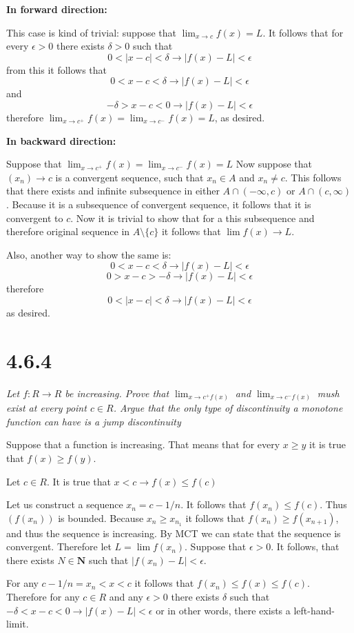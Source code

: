 \documentclass[11pt,oneside,titlepage]{book}
\begin{document}
\textbf{In forward direction:}

This case is kind of trivial: suppose that $\lim_{x \to c} f(x) = L$.
It follows that for every $\epsilon > 0$ there exists $\delta > 0$ such that
$$0 < |x - c| < \delta \to |f(x) - L| < \epsilon$$
from this it follows that
$$0 < x - c < \delta \to |f(x) - L| < \epsilon$$
and
$$-\delta > x - c < 0 \to |f(x) - L| < \epsilon$$
therefore $\lim_{x \to c^{+}}{f(x)} = \lim_{x \to c^{-}}{f(x)} = L$,
as desired.

\textbf{In backward direction:}

Suppose that $\lim_{x \to c^{+}}{f(x)} = \lim_{x \to c^{-}}{f(x)} = L$
Now suppose that $(x_n) \to c$ is a convergent sequence, such that
$x_n \in A$ and $x_n \neq c$. This follows that there exists
and infinite subsequence in either  $A \cap (-\infty, c)$ or
$A \cap (c, \infty)$. Because it is a subsequence of convergent
sequence, it follows that it is convergent to $c$. Now it is trivial to show
that for a this subsequence and therefore original sequence in
$A \setminus \{c\}$ it follows that $\lim f(x) \to L$.


Also, another way to show the same is:
$$0 < x - c < \delta  \to |f(x) - L| < \epsilon $$
$$0 > x - c > -\delta \to |f(x) - L| < \epsilon$$
therefore 
$$0 < |x - c| < \delta \to |f(x) - L| < \epsilon$$
as desired.

\section*{4.6.4}
\textit{Let $f: R \to R$ be increasing. Prove that $\lim_{x \to c^{+}{f(x)}}$
  and $\lim_{x \to c^{-}{f(x)}}$ mush exist at every point $c \in R$. Argue
  that the only type of discontinuity a monotone function can have is a
  jump discontinuity }

Suppose that a function is increasing. That means that for every  $x \geq y$
it is true that  $f(x) \geq f(y)$. 

Let $c \in R$. It is true that $x < c \to f(x) \leq f(c)$

Let us construct a sequence $x_n = c - 1/n$. It follows that
$f(x_n) \leq f(c)$. Thus $(f(x_n))$ is bounded. Because $x_n \geq x_{n_1}$
it follows that $f(x_n) \geq f(x_{n + 1})$, and thus the sequence is
increasing. By MCT we can state that the sequence is convergent. Therefore
let $L = \lim f(x_n)$. Suppose that
$\epsilon > 0$. It follows, that there exists $N \in \textbf{N}$ such
that $|f(x_n) - L| < \epsilon$.

For any $c - 1/n =  x_n < x < c$ it follows that $f(x_n) \leq f(x) \leq f(c)$. Therefore for any $c \in R$ and
any $\epsilon > 0$ there exists $\delta$ such that
$-\delta < x  - c< 0 \to |f(x) - L| < \epsilon$
or in other words, there exists a left-hand-limit.
\end{document}
